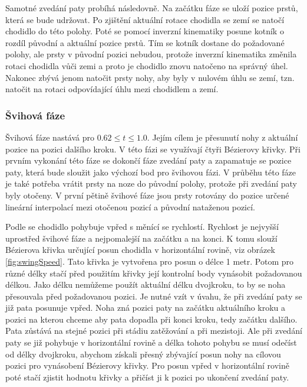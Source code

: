 Samotné zvedání paty probíhá následovně. Na začátku fáze se uloží pozice prstů, která se bude udržovat. Po zjištění aktuální rotace chodidla se zemí se natočí chodidlo do této polohy. Poté se pomocí inverzní kinematiky  posune kotník o rozdíl původní a aktuální pozice prstů. Tím se kotník dostane do požadované polohy, ale prsty v původní pozici nebudou, protože inverzní kinematika změnila rotaci chodidla vůči zemi a proto je chodidlo znovu natočeno na správný úhel. Nakonec zbývá jenom natočit prsty nohy, aby byly v nulovém úhlu se zemí, tzn. natočit na rotaci odpovídající úhlu mezi chodidlem a zemí.

\subsubsection{Švihová fáze}
Švihová fáze nastává pro $0.62 \leq t \leq 1.0$. Jejím cílem je přesunutí nohy z aktuální pozice na pozici dalšího kroku. V této fázi se využívají čtyři Bézierovy křivky. Při prvním vykonání této fáze se dokončí fáze zvedání paty a zapamatuje se pozice paty, která bude sloužit jako výchozí bod pro švihovou fázi. V průběhu této fáze je také potřeba vrátit prsty na noze do původní polohy, protože při zvedání paty byly otočeny. V první pětině švihové fáze jsou prsty rotovány do pozice určené lineární interpolací mezi otočenou pozicí a původní nataženou pozicí.

Podle \cite{chung} se chodidlo pohybuje vpřed s měnící se rychlostí.  Rychlost je nejvyšší uprostřed švihové fáze a nejpomalejší na začátku a na konci. K tomu slouží Bézierova křivka určující posun chodidla v horizontální rovině, viz obrázek \ref{fig:swingSpeed}. Tato křivka je vytvořena pro posun o délce 1 metr. Potom pro různé délky stačí před použitím křivky její kontrolní body vynásobit požadovanou délkou. Jako délku nemůžeme použít aktuální délku dvojkroku, to by se noha přesouvala před požadovanou pozici. Je nutné vzít v úvahu, že při zvedání paty se již  pata posunuje vpřed. Noha zná pozici paty na začátku aktuálního kroku a pozici na kterou chceme aby pata dopadla při konci kroku, tedy začátku dalšího. Pata zůstává na stejné pozici při stádiu zatěžování a při mezistoji. Ale při zvedání paty se již pohybuje v horizontální rovině a délka tohoto pohybu se musí odečíst od délky dvojkroku, abychom získali přesný zbývající posun nohy na cílovou pozici pro vynásobení Bézierovy křivky. Pro posun vpřed v horizontální rovině poté stačí zjistit hodnotu křivky a přičíst ji k pozici po ukončení zvedání paty.

